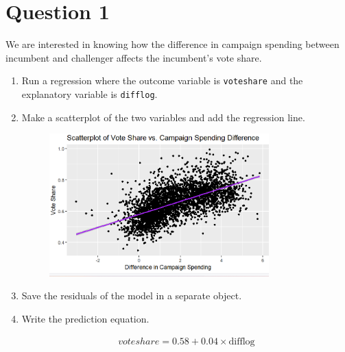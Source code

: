 \documentclass[12pt,letterpaper]{article}
\begin{document}
\section*{Question 1}
\vspace{.25cm}
\noindent We are interested in knowing how the difference in campaign spending between incumbent and challenger affects the incumbent's vote share. 
	\begin{enumerate}
		\item Run a regression where the outcome variable is \texttt{voteshare} and the explanatory variable is \texttt{difflog}.
\\
	
    \vspace{.5cm}
		\item Make a scatterplot of the two variables and add the regression line. 	
	
	\begin{figure}[h]
		\centering
		\includegraphics[width=0.8\textwidth]{Question1.png}
	\end{figure}	
		\item Save the residuals of the model in a separate object.		
		\\
			
		\item Write the prediction equation.
			
			\begin{align*}
				voteshare = 0.58 + 0.04 \times \text{difflog}
			\end{align*}
	\end{enumerate}
	
\end{document}
